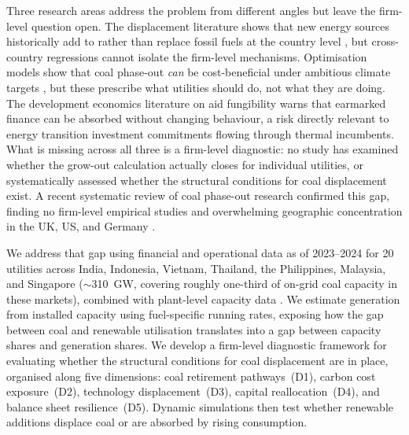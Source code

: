 \documentclass[review,3p,authoryear]{elsarticle}
\begin{document}
Three research areas address the problem from different angles but leave the firm-level question open. The displacement literature shows that new energy sources historically add to rather than replace fossil fuels at the country level \citep{York2012,Zhu2017}, but cross-country regressions cannot isolate the firm-level mechanisms. Optimisation models show that coal phase-out \textit{can} be cost-beneficial under ambitious climate targets \citep{NatureComms2025India}, but these prescribe what utilities should do, not what they are doing. The development economics literature on aid fungibility \citep{Feyzioglu1998} warns that earmarked finance can be absorbed without changing behaviour, a risk directly relevant to energy transition investment commitments flowing through thermal incumbents. What is missing across all three is a firm-level diagnostic: no study has examined whether the grow-out calculation actually closes for individual utilities, or systematically assessed whether the structural conditions for coal displacement exist. A recent systematic review of coal phase-out research confirmed this gap, finding no firm-level empirical studies and overwhelming geographic concentration in the UK, US, and Germany \citep{Diluiso2021}.

We address that gap using financial and operational data as of 2023--2024 for 20 utilities across India, Indonesia, Vietnam, Thailand, the Philippines, Malaysia, and Singapore ($\sim$310~GW, covering roughly one-third of on-grid coal capacity in these markets), combined with plant-level capacity data \citep{GEM2026Coal}. We estimate generation from installed capacity using fuel-specific running rates, exposing how the gap between coal and renewable utilisation translates into a gap between capacity shares and generation shares. We develop a firm-level diagnostic framework for evaluating whether the structural conditions for coal displacement are in place, organised along five dimensions: coal retirement pathways~(D1), carbon cost exposure~(D2), technology displacement~(D3), capital reallocation~(D4), and balance sheet resilience~(D5). Dynamic simulations then test whether renewable additions displace coal or are absorbed by rising consumption.
\end{document}
